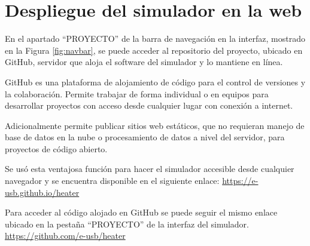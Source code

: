 \section{Despliegue del simulador en la web}
\par En el apartado ``PROYECTO'' de la barra de navegación en la interfaz, mostrado en la Figura \ref{fig:navbar}, se puede acceder al repositorio del proyecto, ubicado en GitHub, servidor que aloja el software del simulador y lo mantiene en línea.
\par GitHub es una plataforma de alojamiento de código para el control de versiones y la colaboración. Permite trabajar de forma individual o en equipos para desarrollar proyectos con acceso desde cualquier lugar con conexión a internet.
\par Adicionalmente permite publicar sitios web estáticos, que no requieran manejo de base de datos en la nube o procesamiento de datos a nivel del servidor, para proyectos de código abierto.
\par Se usó esta ventajosa función para hacer el simulador accesible desde cualquier navegador y se encuentra disponible en el siguiente enlace: \url{https://e-usb.github.io/heater}
\par Para acceder al código alojado en GitHub se puede seguir el mismo enlace ubicado en la pestaña ``PROYECTO'' de la interfaz del simulador. \url{https://github.com/e-usb/heater}